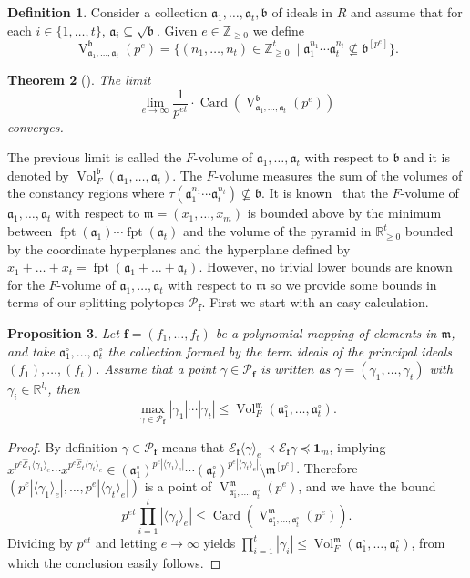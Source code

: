 \documentclass[12pt]{amsart}
\newtheorem{theorem}{Theorem}[section]
\newtheorem{proposition}[theorem]{Proposition}
\theoremstyle{definition}
\newtheorem{definition}[theorem]{Definition}
\numberwithin{equation}{subsection}
\DeclareMathOperator{\fpt}{fpt}
\newcommand{\RR}{\mathbb{R}}
\newcommand{\m}{\mathfrak{m}}
\newcommand{\fa}{\mathfrak{a}}
\newcommand{\fb}{\mathfrak{b}}
\newcommand{\SP}{\mathcal{P}}
\newcommand{\Bf}{\boldsymbol{f}}
\newcommand{\Card}{\operatorname{Card}}
\newcommand{\E}{\mathcal{E}}
\newcommand{\tE}{\operatorname{\widehat{\E}}}
\newcommand{\Vol}{\operatorname{Vol}}
\newcommand{\V}{\operatorname{V}}
\renewcommand{\!}[1]{{\color{red}\text{\Huge$\star$ }#1}}
\begin{document}
\begin{definition}\label{def1}
	Consider a collection $\mathfrak{a}_1, \ldots, \mathfrak{a}_t, \fb$ of ideals in $R$ and assume that for each $i\in\{1,\ldots,t\}$, $\fa_i\subseteq \sqrt{\fb}$. Given $e\in \mathbb{Z}_{\geq 0}$ we define
	\[
	\V_{\mathfrak{a}_1, \ldots, \mathfrak{a}_t}^{\fb}(p^e)=\{(n_1,\ldots, n_t)\in\mathbb{Z}_{\geq 0}^t\ \mid  
	\fa_1^{n_1}\cdots \fa_t^{n_t}\not \subseteq \fb^{[p^e]}\}.
	\]
\end{definition}
\begin{theorem}[{\cite[Theorem $2.13$]{BCNBRV}}]\label{ThmLimitExistsSec}
	The limit $$\lim_{e\to \infty}\frac{1}{{p^{et}}} \cdot \Card ( \V_{\mathfrak{a}_1, \ldots, \mathfrak{a}_t}^{\fb}(p^{e}))$$
	converges.
\end{theorem}
The previous limit is called the $F$-volume of $\mathfrak{a}_1, \ldots, \mathfrak{a}_t$ with respect to $\fb$ and it is denoted by $\Vol_F^\fb(\mathfrak{a}_1, \ldots, \mathfrak{a}_t)$. The $F$-volume measures the sum of the volumes of the constancy regions where $\tau(\fa^{n_1}_1 \cdots \fa^{n_t}_t)\not\subseteq \fb$. It is known~\cite{BCNBRV} that  the $F$-volume of $\mathfrak{a}_1, \ldots, \mathfrak{a}_t$ with respect to $\m=(x_1, \ldots, x_m)$ is bounded above by the minimum between $\fpt(\fa_1)\cdots\fpt(\fa_t)$ and the volume of the pyramid in $\RR_{\geq 0}^t$ bounded by the coordinate hyperplanes and the hyperplane defined by $x_1+\ldots+x_t=\fpt(\fa_1+\ldots +\fa_t)$. However, no trivial lower bounds are known for the $F$-volume  of $\mathfrak{a}_1, \ldots, \mathfrak{a}_t$ with respect to $\m$ so we provide some bounds in terms of our splitting polytopes $\SP_{\Bf}$. First we start with an easy calculation.

\begin{proposition} \label{prop-volume-term-ideal}
Let $\Bf=(f_1,\ldots,f_t)$ be a polynomial mapping of elements in $\m$, and take $\fa_1^\circ,\ldots,\fa_t^\circ$ the collection formed by the term ideals of the principal ideals $(f_1),\ldots,(f_t)$. Assume that a point $\gamma \in \SP_{\Bf}$ is written as $\gamma=(\gamma_1, \ldots, \gamma_t)$ with $\gamma_i \in \RR^{l_i}$, then
$$\max_{\gamma \in \SP_{\Bf}}  |\gamma_1| \cdots  |\gamma_t|  \leq \Vol_F^\m(\fa_1^\circ,\ldots,\fa_t^\circ).$$
\end{proposition}
\begin{proof} 
By definition  $\gamma\in \SP_{\Bf}$ means that $\E_{\Bf} \langle \gamma \rangle_e \prec \E_{\Bf} \gamma \preceq  \textbf{1}_m$, implying  $x^{p^{e}\tE_1 \langle \gamma_1 \rangle_e}  \cdots x^{p^{e}\tE_t \langle \gamma_t \rangle_e} \in (\fa_1^\circ)^{p^{e}|\langle \gamma_1 \rangle_e|} \cdots (\fa_t^\circ)^{p^{e}| \langle \gamma_t \rangle_e|} \setminus \m^{[p^{e}]}$. Therefore   
$(p^{e}|\langle \gamma_1 \rangle_e|, \ldots, p^{e} | \langle \gamma_t \rangle_e|)$ is a point of $\V_{\fa_1^\circ,\ldots,\fa_t^\circ}^{\m}(p^{e})$, and we have the bound
 $$p^{et}\prod_{i=1}^t | \langle \gamma_i \rangle_e| \leq \Card \left( \V_{\fa_1^\circ,\ldots,\fa_t^\circ}^{\m}(p^{e}) \right).$$ 
Dividing by $p^{et}$ and letting $e \rightarrow \infty$ yields $\prod_{i=1}^t | \gamma_i| \leq \Vol_F^{\m}(\fa_1^\circ,\ldots,\fa_t^\circ)$, 
from which the conclusion easily follows.
\end{proof}
\end{document}
